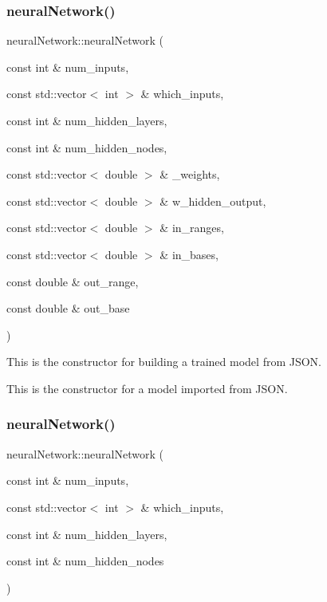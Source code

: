 \subsubsection{\texorpdfstring{neural\+Network()}{neuralNetwork()}\hspace{0.1cm}{\footnotesize\ttfamily [1/2]}}
{\footnotesize\ttfamily neural\+Network\+::neural\+Network (\begin{DoxyParamCaption}\item[{const int \&}]{num\+\_\+inputs,  }\item[{const std\+::vector$<$ int $>$ \&}]{which\+\_\+inputs,  }\item[{const int \&}]{num\+\_\+hidden\+\_\+layers,  }\item[{const int \&}]{num\+\_\+hidden\+\_\+nodes,  }\item[{const std\+::vector$<$ double $>$ \&}]{\+\_\+weights,  }\item[{const std\+::vector$<$ double $>$ \&}]{w\+\_\+hidden\+\_\+output,  }\item[{const std\+::vector$<$ double $>$ \&}]{in\+\_\+ranges,  }\item[{const std\+::vector$<$ double $>$ \&}]{in\+\_\+bases,  }\item[{const double \&}]{out\+\_\+range,  }\item[{const double \&}]{out\+\_\+base }\end{DoxyParamCaption})}

This is the constructor for building a trained model from J\+S\+ON.

This is the constructor for a model imported from J\+S\+ON. \mbox{\label{classneural_network_a4a43fb0fb07a2cde9234fd1b4dbc7f91}} 
\subsubsection{\texorpdfstring{neural\+Network()}{neuralNetwork()}\hspace{0.1cm}{\footnotesize\ttfamily [2/2]}}
{\footnotesize\ttfamily neural\+Network\+::neural\+Network (\begin{DoxyParamCaption}\item[{const int \&}]{num\+\_\+inputs,  }\item[{const std\+::vector$<$ int $>$ \&}]{which\+\_\+inputs,  }\item[{const int \&}]{num\+\_\+hidden\+\_\+layers,  }\item[{const int \&}]{num\+\_\+hidden\+\_\+nodes }\end{DoxyParamCaption})}

